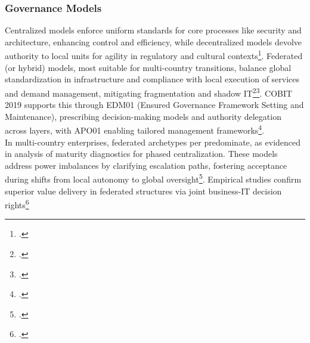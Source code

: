 \subsubsection{Governance Models}
Centralized models enforce uniform standards for core processes like security and architecture, enhancing control and efficiency, while decentralized models devolve authority to local units for agility in regulatory and cultural contexts\footcite{weillITGovernanceHow2004}.
Federated (or hybrid) models, most suitable for multi-country transitions, balance global standardization in infrastructure and compliance with local execution of services and demand management, mitigating fragmentation and shadow IT\footcite{ionitaITGovernanceGlobal2009}\footcite{cobit2019Framework2018a}.
COBIT 2019 supports this through EDM01 (Ensured Governance Framework Setting and Maintenance), prescribing decision-making models and authority delegation across layers, with APO01 enabling tailored management frameworks\footcite[33]{isacaCOBIT2019Framework2018}.
\\
In multi-country enterprises, federated archetypes per \cite{rossForgetStrategyFocus2005} predominate, as evidenced in \cite{ionitaITGovernanceGlobal2009} analysis of maturity diagnostics for phased centralization.
These models address power imbalances by clarifying escalation paths, fostering acceptance during shifts from local autonomy to global oversight\footcite[3]{emryITGovernanceGuide2024}.
Empirical studies confirm superior value delivery in federated structures via joint business-IT decision rights\footcite[1391-1392]{iloriComprehensiveReviewIt2024}

